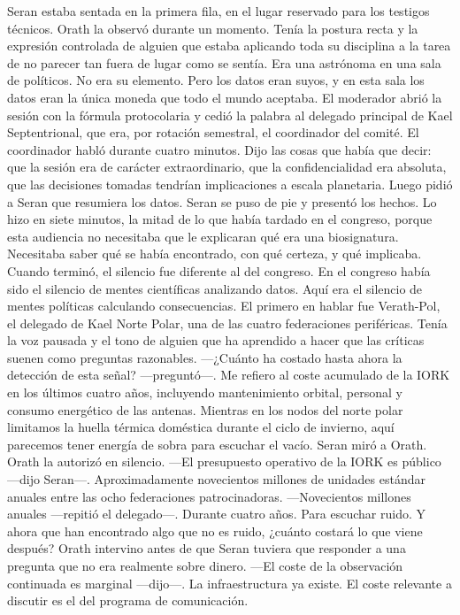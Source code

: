 \documentclass[11pt,a5paper,twoside]{book}
\begin{document}
Seran estaba sentada en la primera fila, en el lugar reservado para los testigos técnicos. Orath la observó durante un momento. Tenía la postura recta y la expresión controlada de alguien que estaba aplicando toda su disciplina a la tarea de no parecer tan fuera de lugar como se sentía. Era una astrónoma en una sala de políticos. No era su elemento. Pero los datos eran suyos, y en esta sala los datos eran la única moneda que todo el mundo aceptaba.
El moderador abrió la sesión con la fórmula protocolaria y cedió la palabra al delegado principal de Kael Septentrional, que era, por rotación semestral, el coordinador del comité.
El coordinador habló durante cuatro minutos. Dijo las cosas que había que decir: que la sesión era de carácter extraordinario, que la confidencialidad era absoluta, que las decisiones tomadas tendrían implicaciones a escala planetaria. Luego pidió a Seran que resumiera los datos.
Seran se puso de pie y presentó los hechos. Lo hizo en siete minutos, la mitad de lo que había tardado en el congreso, porque esta audiencia no necesitaba que le explicaran qué era una biosignatura. Necesitaba saber qué se había encontrado, con qué certeza, y qué implicaba.
Cuando terminó, el silencio fue diferente al del congreso. En el congreso había sido el silencio de mentes científicas analizando datos. Aquí era el silencio de mentes políticas calculando consecuencias.
El primero en hablar fue Verath-Pol, el delegado de Kael Norte Polar, una de las cuatro federaciones periféricas. Tenía la voz pausada y el tono de alguien que ha aprendido a hacer que las críticas suenen como preguntas razonables.
—¿Cuánto ha costado hasta ahora la detección de esta señal? —preguntó—. Me refiero al coste acumulado de la IORK en los últimos cuatro años, incluyendo mantenimiento orbital, personal y consumo energético de las antenas. Mientras en los nodos del norte polar limitamos la huella térmica doméstica durante el ciclo de invierno, aquí parecemos tener energía de sobra para escuchar el vacío.
Seran miró a Orath. Orath la autorizó en silencio.
—El presupuesto operativo de la IORK es público —dijo Seran—. Aproximadamente novecientos millones de unidades estándar anuales entre las ocho federaciones patrocinadoras.
—Novecientos millones anuales —repitió el delegado—. Durante cuatro años. Para escuchar ruido. Y ahora que han encontrado algo que no es ruido, ¿cuánto costará lo que viene después?
Orath intervino antes de que Seran tuviera que responder a una pregunta que no era realmente sobre dinero.
—El coste de la observación continuada es marginal —dijo—. La infraestructura ya existe. El coste relevante a discutir es el del programa de comunicación.
\end{document}
